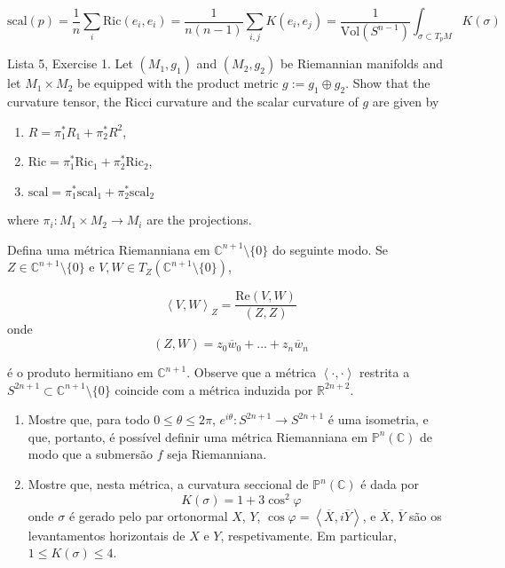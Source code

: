 \begin{lemma}
\label{lemma-scalar-curvature-is-mean-of-sectional}
$$
\text{scal}(p)=\frac{1}{n}\sum_{i}\text{Ric}(e_i,e_i)
=\frac{1}{n(n-1)}\sum_{i,j}K(e_i,e_j)
=\frac{1}{\text{Vol}(S^{n-1})}\int_{\sigma\subset T_pM}K(\sigma)
$$
\end{lemma}

\begin{exercise}
\label{lemma-curvatures-of-product-metric}
Lista 5, Exercise 1. Let $(M_1,g_1)$ and $(M_2,g_2)$ be Riemannian manifolds and
let $M_1\times M_2$ be equipped with the product metric $g:=g_1\oplus g_2$. Show
that the curvature tensor, the Ricci curvature and the scalar curvature of $g$
are given by
\begin{enumerate}
\item $R=\pi_1^*R_1+\pi_2^*R^2$,
\item $\text{Ric}=\pi_1^*\text{Ric}_1+\pi_2^*\text{Ric}_2$,
\item $\text{scal}=\pi_1^*\text{scal}_1+\pi_2^*\text{scal}_2$
\end{enumerate}
where $\pi_i:M_1\times M_2\to M_i$ are the projections.
\end{exercise}

\begin{example}
\label{example-curvature-of-CPn}
Defina uma métrica Riemanniana  em $\mathbb{C}^{n+1}\setminus\{0\}$ do
seguinte modo. Se $Z \in \mathbb{C}^{n+1}\setminus\{0\}$ e $V,W \in T_Z
(\mathbb{C}^{n+1}\setminus\{0\})$,

$$
\left<V,W\right>_Z=\frac{\text{Re}(V,W)}{(Z,Z)}
$$
onde 
$$
(Z,W)=z_0\overline{w}_0+\ldots+z_n\overline{w}_n
$$

é o produto hermitiano em $\mathbb{C}^{n+1}$. Observe que a métrica
$\left<\cdot,\cdot\right>$ restrita a $S^{2n+1}\subset
\mathbb{C}^{n+1}\setminus\{0\}$ coincide com a métrica induzida por
$\mathbb{R}^{2n+2}$.
\begin{enumerate}

\item Mostre que, para todo $0\leq \theta \leq 2\pi$, $e^{i\theta}:S^{2n+1}\to
S^{2n+1}$ é uma isometria, e que, portanto, é possível definir uma métrica
Riemanniana em $\mathbb{P}^n(\mathbb{C})$ de modo que a submersão $f$ seja
Riemanniana.

\item Mostre que, nesta métrica, a curvatura seccional de
$\mathbb{P}^n(\mathbb{C})$ é dada por
$$
K(\sigma)=1+3\cos^2\varphi
$$
onde $\sigma$ é gerado pelo par ortonormal $X$, $Y$, $\cos
\varphi=\left<\overline{X},i\overline{Y}\right>$, e $\overline{X}$,
$\overline{Y}$ são os levantamentos horizontais de $X$ e $Y$, respetivamente. Em
particular, $1 \leq  K(\sigma) \leq  4$.
\end{enumerate}
\end{example}

